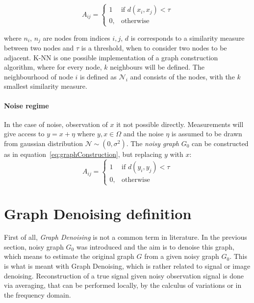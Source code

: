 \begin{equation}
    \label{eq:graphConstruction}
    A_{ij} =    
    \begin{cases}
        1  & \text{if } d(x_i, x_j) < \tau\\
        0, & \text{otherwise}
    \end{cases}
\end{equation}

where $n_i$, $n_j$ are nodes from indices $i,j$, $d$ is corresponds to a similarity measure between two nodes and $\tau$ is a threshold, 
when to consider two nodes to be adjacent. K-NN is one possible implementation of a graph construction algorithm, 
where for every node, $k$ neighbours will be defined.
The neighbourhood of node $i$ is defined as $\mathcal{N}_i$ and consists of the nodes, with the $k$ smallest similarity measure.

\paragraph{Noise regime}
In the case of noise, observation of $x$ it not possible directly.
Measurements will give access to $y = x + \eta$ where $y,x \in \Omega$ and the noise $\eta$ is assumed to be drawn from gaussian distribution $\mathcal{N} \sim (0,\sigma^2)$.
The \textit{noisy graph} $G_0$ can be constructed as in equation~\ref{eq:graphConstruction}, but replacing $y$ with $x$:
\begin{equation}
    \label{eq:graphConstructionNoise}
    A_{ij} =    
    \begin{cases}
        1  & \text{if } d(y_i, y_j) < \tau\\
        0, & \text{otherwise}
    \end{cases}
\end{equation}


\section{Graph Denoising definition}

First of all, \textit{Graph Denoising} is not a common term in literature.
In the previous section, noisy graph $G_0$ was introduced and the aim is to denoise this graph,
which means to estimate the original graph $G$ from a given noisy graph $G_0$. 
This is what is meant with Graph Denoising, which is rather related to signal or image denoising.
Reconstruction of a true signal given noisy observation signal is done via averaging, that can be performed
locally, by the calculus of variations or in the frequency domain\cite{noneLocalMean}. 

